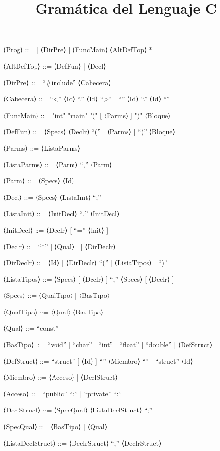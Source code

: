 \documentclass{article}
\begin{document}
\title{Gramática del Lenguaje C}
\maketitle

\setlength{\grammarindent}{6em}
\begin{grammar}

⟨Prog⟩ ::=
    [ ⟨DirPre⟩ ]
    ⟨FuncMain⟩
    { ⟨AltDefTop⟩ }*

⟨AltDefTop⟩ ::=
      ⟨DefFun⟩
    | ⟨Decl⟩

⟨DirPre⟩ ::=
    “\#include” ⟨Cabecera⟩

⟨Cabecera⟩ ::=
      “<” ⟨Id⟩ “.” ⟨Id⟩ “>”
    | “\”” ⟨Id⟩ “.” ⟨Id⟩ “\””

〈FuncMain〉 ::=
        "int" "main" "(" [ 〈Parms〉 ] ")" 〈Bloque〉


⟨DefFun⟩ ::=
    ⟨Specs⟩ ⟨Declr⟩ “(” [ ⟨Parms⟩ ] “)” ⟨Bloque⟩

⟨Parms⟩ ::=
    ⟨ListaParms⟩

⟨ListaParms⟩ ::=
    ⟨Parm⟩ { “,” ⟨Parm⟩ }

⟨Parm⟩ ::=
    ⟨Specs⟩ ⟨Id⟩


⟨Decl⟩ ::=
    ⟨Specs⟩ ⟨ListaInit⟩ “;”

⟨ListaInit⟩ ::=
    ⟨InitDecl⟩ { “,” ⟨InitDecl⟩ }

⟨InitDecl⟩ ::=
    ⟨Declr⟩ [ “=” ⟨Init⟩ ]

⟨Declr⟩ ::=
    { “*” [ ⟨Qual〉 ] } ⟨DirDeclr⟩

⟨DirDeclr⟩ ::=
      ⟨Id⟩
    | ⟨DirDeclr⟩ “(” [ ⟨ListaTipos⟩ ] “)”

⟨ListaTipos⟩ ::=
    ⟨Specs⟩ [ ⟨Declr⟩ ] { “,” ⟨Specs⟩ [ ⟨Declr⟩ ] }

〈Specs〉 ::= 〈QualTipo〉 | 〈BasTipo〉

〈QualTipo〉 ::= 〈Qual〉 〈BasTipo〉


⟨Qual⟩ ::=
    “const”

⟨BasTipo⟩ ::=
      “void”
    | “char”
    | “int”
    | “float”
    | “double”
    | ⟨DefStruct⟩

⟨DefStruct⟩ ::=
      “struct” [ ⟨Id⟩ ] “{” { ⟨Miembro⟩ } “}”
    | “struct” ⟨Id⟩

⟨Miembro⟩ ::=
      ⟨Acceso⟩
    | ⟨DeclStruct⟩

⟨Acceso⟩ ::=
      “public” “:”
    | “private” “:”

⟨DeclStruct⟩ ::=
    ⟨SpecQual⟩ ⟨ListaDeclStruct⟩ “;”

⟨SpecQual⟩ ::=
      ⟨BasTipo⟩
    | ⟨Qual⟩

⟨ListaDeclStruct⟩ ::=
    ⟨DeclrStruct⟩ { “,” ⟨DeclrStruct⟩ }


\end{grammar}
\end{document}
